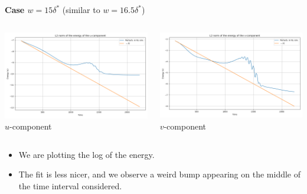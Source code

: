 \documentclass[
  aspectratio=169, %
  t, %
  onlytextwidth, %
  10pt, %
]{beamer}
\begin{document}
\begin{frame}
  \textbf{Case $w=15\delta^*$} (similar to $w=16.5\delta^*$)

  \begin{columns}[T] %
    \begin{column}{0.48\linewidth} %
      {
	\centering
	\includegraphics[width=\linewidth]{Images/energyL2_error_u15.png}
	$u$-component
      }
    \end{column}
    \begin{column}{0.48\linewidth} %
      {
	\centering
	\includegraphics[width=\linewidth]{Images/energyL2_error_v15.png}
	$v$-component
      }
    \end{column}
  \end{columns}
  \begin{itemize}
    \item We are plotting the log of the energy.
    \item The fit is less nicer, and we observe a weird bump appearing on the middle of the time interval considered.
  \end{itemize}
\end{frame}
\end{document}
